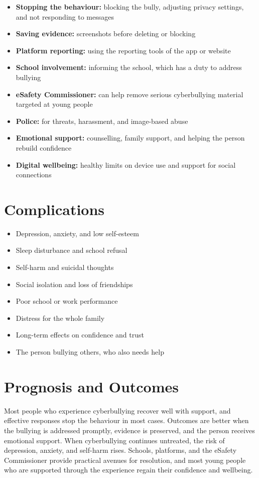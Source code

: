 \begin{itemize}
    \item \textbf{Stopping the behaviour:} blocking the bully, adjusting privacy settings, and not responding to messages
    \item \textbf{Saving evidence:} screenshots before deleting or blocking
    \item \textbf{Platform reporting:} using the reporting tools of the app or website
    \item \textbf{School involvement:} informing the school, which has a duty to address bullying
    \item \textbf{eSafety Commissioner:} can help remove serious cyberbullying material targeted at young people
    \item \textbf{Police:} for threats, harassment, and image-based abuse
    \item \textbf{Emotional support:} counselling, family support, and helping the person rebuild confidence
    \item \textbf{Digital wellbeing:} healthy limits on device use and support for social connections
\end{itemize}

\section*{Complications}
\begin{itemize}
    \item Depression, anxiety, and low self-esteem
    \item Sleep disturbance and school refusal
    \item Self-harm and suicidal thoughts
    \item Social isolation and loss of friendships
    \item Poor school or work performance
    \item Distress for the whole family
    \item Long-term effects on confidence and trust
    \item The person bullying others, who also needs help
\end{itemize}

\section*{Prognosis and Outcomes}
Most people who experience cyberbullying recover well with support, and effective responses stop the behaviour in most cases. Outcomes are better when the bullying is addressed promptly, evidence is preserved, and the person receives emotional support. When cyberbullying continues untreated, the risk of depression, anxiety, and self-harm rises. Schools, platforms, and the eSafety Commissioner provide practical avenues for resolution, and most young people who are supported through the experience regain their confidence and wellbeing.

